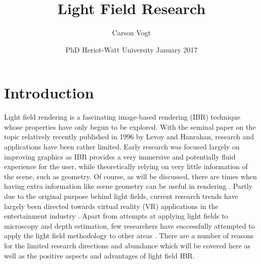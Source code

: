 \documentclass[12pt]{report}
\begin{document}
\title{Light Field Research \vspace{2.5cm}}	%
\author{
\Large Carson Vogt \vspace{1cm} \\ 
}

\date{
	\centering
	PhD \endgraf\medskip
	Heriot-Watt University \endgraf{} January 2017
}

\maketitle

\listoffigures

\tableofcontents

\chapter{Introduction}

Light field rendering is a fascinating image-based rendering (IBR) technique whose properties have only begun to be explored. With the seminal paper on the topic relatively recently published in 1996 by Levoy and Hanrahan\cite{Levoy96}, research and applications have been rather limited. Early research was focused largely on improving graphics as IBR provides a very immersive and potentially fluid experience for the user, while theoretically relying on very little information of the scene, such as geometry. Of course, as will be discussed, there are times when having extra information like scene geometry can be useful in rendering \cite{Gortler96}. Partly due to the original purpose behind light fields, current research trends have largely been directed towards virtual reality (VR) applications in the entertainment industry \cite{Anderson16, Davis12, Kalantari16}. Apart from attempts at applying light fields to microscopy and depth estimation, few researchers have successfully attempted to apply the light field methodology to other areas \cite{Levoy06b}. There are a number of reasons for the limited research directions and abundance which will be covered here as well as the positive aspects and advantages of light field IBR.
\end{document}
